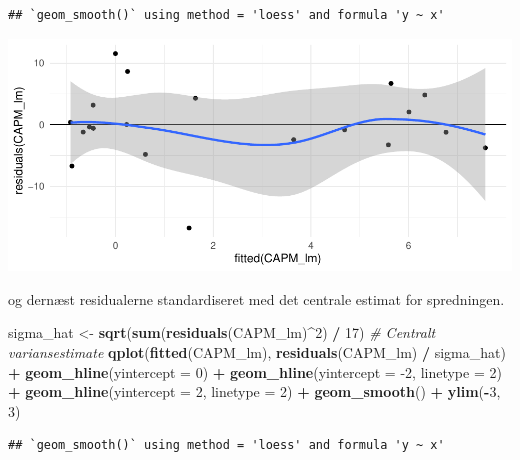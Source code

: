 \documentclass[
]{article}
\newenvironment{Shaded}{\begin{snugshade}}{\end{snugshade}}
\newcommand{\CommentTok}[1]{\textcolor[rgb]{0.56,0.35,0.01}{\textit{#1}}}
\newcommand{\DataTypeTok}[1]{\textcolor[rgb]{0.13,0.29,0.53}{#1}}
\newcommand{\DecValTok}[1]{\textcolor[rgb]{0.00,0.00,0.81}{#1}}
\newcommand{\KeywordTok}[1]{\textcolor[rgb]{0.13,0.29,0.53}{\textbf{#1}}}
\newcommand{\NormalTok}[1]{#1}
\newcommand{\OperatorTok}[1]{\textcolor[rgb]{0.81,0.36,0.00}{\textbf{#1}}}
\newcommand{\StringTok}[1]{\textcolor[rgb]{0.31,0.60,0.02}{#1}}
\begin{document}
\begin{verbatim}
## `geom_smooth()` using method = 'loess' and formula 'y ~ x'
\end{verbatim}

\includegraphics{matstatproblems20-21_files/figure-latex/unnamed-chunk-94-1.pdf}

og dernæst residualerne standardiseret med det centrale estimat for
spredningen.

\begin{Shaded}
\begin{Highlighting}[]
\NormalTok{sigma_hat <-}\StringTok{ }\KeywordTok{sqrt}\NormalTok{(}\KeywordTok{sum}\NormalTok{(}\KeywordTok{residuals}\NormalTok{(CAPM_lm)}\OperatorTok{^}\DecValTok{2}\NormalTok{) }\OperatorTok{/}\StringTok{ }\DecValTok{17}\NormalTok{)  }\CommentTok{# Centralt variansestimate}
\KeywordTok{qplot}\NormalTok{(}\KeywordTok{fitted}\NormalTok{(CAPM_lm), }\KeywordTok{residuals}\NormalTok{(CAPM_lm) }\OperatorTok{/}\StringTok{ }\NormalTok{sigma_hat) }\OperatorTok{+}\StringTok{ }
\StringTok{    }\KeywordTok{geom_hline}\NormalTok{(}\DataTypeTok{yintercept =} \DecValTok{0}\NormalTok{) }\OperatorTok{+}
\StringTok{    }\KeywordTok{geom_hline}\NormalTok{(}\DataTypeTok{yintercept =} \DecValTok{-2}\NormalTok{, }\DataTypeTok{linetype =} \DecValTok{2}\NormalTok{) }\OperatorTok{+}
\StringTok{    }\KeywordTok{geom_hline}\NormalTok{(}\DataTypeTok{yintercept =} \DecValTok{2}\NormalTok{, }\DataTypeTok{linetype =} \DecValTok{2}\NormalTok{) }\OperatorTok{+}
\StringTok{    }\KeywordTok{geom_smooth}\NormalTok{() }\OperatorTok{+}
\StringTok{    }\KeywordTok{ylim}\NormalTok{(}\OperatorTok{-}\DecValTok{3}\NormalTok{, }\DecValTok{3}\NormalTok{)}
\end{Highlighting}
\end{Shaded}

\begin{verbatim}
## `geom_smooth()` using method = 'loess' and formula 'y ~ x'
\end{verbatim}
\end{document}
